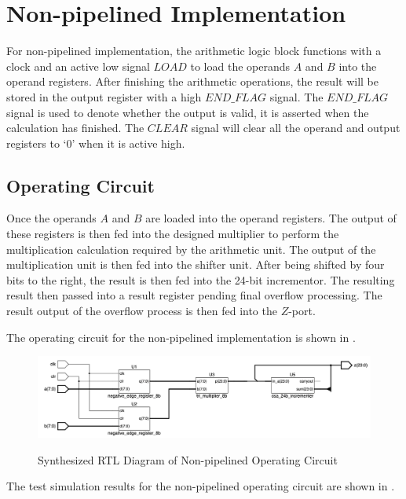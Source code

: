 \section{Non-pipelined Implementation}

For non-pipelined implementation, the arithmetic logic block functions with a clock
and an active low signal \(LOAD\) to load the operands \(A\) and \(B\) into the operand registers.
After finishing the arithmetic operations, the result will be stored in the output register with a high \(END\_FLAG\) signal.
The \(END\_FLAG\) signal is used to denote whether the output is valid, it is asserted when the calculation has finished.
The \(CLEAR\) signal will clear all the operand and output registers to ‘0’ when it is active high.

\subsection{Operating Circuit}

Once the operands \(A\) and \(B\) are loaded into the operand registers.
The output of these registers is then fed into the designed multiplier to perform the multiplication calculation required by the arithmetic unit.
The output of the multiplication unit is then fed into the shifter unit.
After being shifted by four bits to the right, the result is then fed into the 24-bit incrementor.
The resulting result then passed into a result register pending final overflow processing.
The result output of the overflow process is then fed into the \(Z\)-port.

\noindent The operating circuit for the non-pipelined implementation is shown in .

\begin{figure}[!htp]
	\centering
	\caption{Synthesized RTL Diagram of Non-pipelined Operating Circuit}
	\includegraphics[width=\textwidth]{../img/non_p_op_rtl.png}
	\label{fig:non_p_op_rtl}
\end{figure}

\noindent The test simulation results for the non-pipelined operating circuit are shown in .


